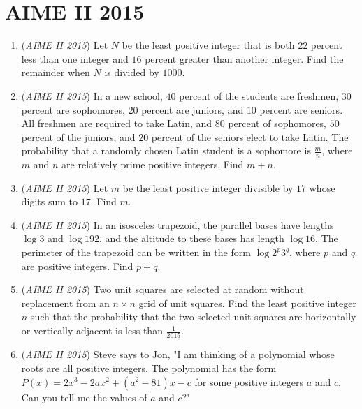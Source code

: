 \section{AIME II 2015}
        \begin{enumerate}
        	\item (\textit{AIME II 2015}) Let $N$ be the least positive integer that is both $22$ percent less than one integer and $16$ percent greater than another integer. Find the remainder when $N$ is divided by $1000$.


 

	\item (\textit{AIME II 2015}) In a new school, $40$ percent of the students are freshmen, $30$ percent are sophomores, $20$ percent are juniors, and $10$ percent are seniors. All freshmen are required to take Latin, and $80$ percent of sophomores, $50$ percent of the juniors, and $20$ percent of the seniors elect to take Latin. The probability that a randomly chosen Latin student is a sophomore is $\frac{m}{n}$, where $m$ and $n$ are relatively prime positive integers. Find $m+n$.


 

	\item (\textit{AIME II 2015}) Let $m$ be the least positive integer divisible by $17$ whose digits sum to $17$. Find $m$.


 

	\item (\textit{AIME II 2015}) In an isosceles trapezoid, the parallel bases have lengths $\log 3$ and $\log 192$, and the altitude to these bases has length $\log 16$. The perimeter of the trapezoid can be written in the form $\log 2^p 3^q$, where $p$ and $q$ are positive integers. Find $p + q$.


 

	\item (\textit{AIME II 2015}) Two unit squares are selected at random without replacement from an $n \times n$ grid of unit squares. Find the least positive integer $n$ such that the probability that the two selected unit squares are horizontally or vertically adjacent is less than $\frac{1}{2015}$.


 

	\item (\textit{AIME II 2015}) Steve says to Jon, "I am thinking of a polynomial whose roots are all positive integers. The polynomial has the form $P(x) = 2x^3-2ax^2+(a^2-81)x-c$ for some positive integers $a$ and $c$. Can you tell me the values of $a$ and $c$?"



\end{enumerate}
